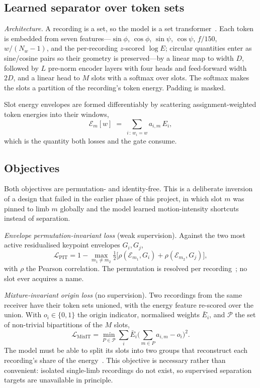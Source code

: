 \documentclass[conference]{IEEEtran}
\begin{document}
\subsection{Learned separator over token sets}
\label{sec:model_arch}

\emph{Architecture.} A recording is a set, so the model is a set
transformer~\cite{lee2019settransformer,vaswani2017attention}. Each token is
embedded from seven features---$\sin\phi$, $\cos\phi$, $\sin\psi$, $\cos\psi$,
$f/150$, $w/(N_w - 1)$, and the per-recording $z$-scored $\log E$; circular
quantities enter as sine/cosine pairs so their geometry is preserved---by a
linear map to width $D$, followed by $L$ pre-norm encoder layers with four
heads and feed-forward width $2D$, and a linear head to $M$ slots with a
softmax over slots. The softmax makes the slots a partition of the recording's
token energy. Padding is masked.

Slot energy envelopes are formed differentiably by scattering
assignment-weighted token energies into their windows,
\begin{equation}
\mathcal{E}_m[w] \;=\; \sum_{i \,:\, w_i = w} a_{i,m}\, E_i ,
\label{eq:env}
\end{equation}
which is the quantity both losses and the gate consume.

\subsection{Objectives}
\label{sec:losses}

Both objectives are permutation- and identity-free. This is a deliberate
inversion of a design that failed in the earlier phase of this project, in
which slot $m$ was pinned to limb $m$ globally and the model learned
motion-intensity shortcuts instead of separation.

\emph{Envelope permutation-invariant loss} (weak supervision). Against the two
most active residualised keypoint envelopes $G_i, G_j$,
\begin{equation}
\mathcal{L}_{\text{PIT}} = 1 - \max_{m_1 \neq m_2}
\tfrac{1}{2}\big[\rho(\mathcal{E}_{m_1}, G_i) + \rho(\mathcal{E}_{m_2}, G_j)\big],
\label{eq:pit}
\end{equation}
with $\rho$ the Pearson correlation. The permutation is resolved per
recording~\cite{yu2017pit}; no slot ever acquires a name.

\emph{Mixture-invariant origin loss} (no supervision). Two recordings from the
same receiver have their token sets unioned, with the energy feature re-scored
over the union. With $o_i \in \{0,1\}$ the origin indicator, normalised weights
$\bar E_i$, and $\mathcal{P}$ the set of non-trivial bipartitions of the $M$
slots,
\begin{equation}
\mathcal{L}_{\text{MixIT}} = \min_{P \in \mathcal{P}}
\sum_i \bar E_i \Big( \textstyle\sum_{m \in P} a_{i,m} - o_i \Big)^{2}.
\label{eq:mixit}
\end{equation}
The model must be able to split its slots into two groups that reconstruct each
recording's share of the energy~\cite{wisdom2020mixit,tzinis2022remixit}. This
objective is necessary rather than convenient: isolated single-limb recordings
do not exist, so supervised separation targets are unavailable in principle.
\end{document}
